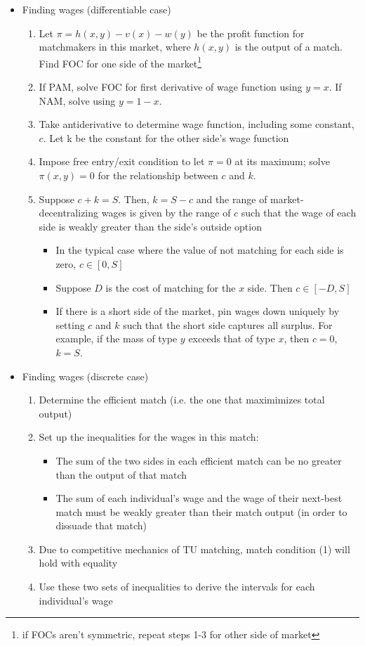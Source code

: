 \documentclass{article}
\begin{document}
\begin{itemize}
	\item Finding wages (differentiable case)
		\begin{enumerate}
			\item Let $\pi=h(x,y)-v(x)-w(y)$ be the profit function for matchmakers in this market, where $h(x,y)$ is the output of a match. Find FOC for one side of the market\footnote{if FOCs aren’t symmetric, repeat steps 1-3 for other side of market}
			\item If PAM, solve FOC for first derivative of wage function using $y=x$. If NAM, solve using $y=1-x$.
			\item Take antiderivative to determine wage function, including some constant, $c$. Let k be the constant for the other side’s wage function
			\item Impose free entry/exit condition to let $\pi=0$ at its maximum; solve $\pi(x,y)=0$ for the relationship between $c$ and $k$. 
			\item Suppose $c+k=S$. Then, $k=S-c$ and the range of market-decentralizing wages is given by the range of $c$ such that the wage of each side is weakly greater than the side’s outside option
				\begin{itemize}
					\item In the typical case where the value of not matching for each side is zero, $c\in[0,S]$
					\item Suppose $D$ is the cost of matching for the $x$ side. Then $c\in[-D,S]$
					\item If there is a short side of the market, pin wages down uniquely by setting $c$ and $k$ such that the short side captures all surplus. For example, if the mass of type $y$ exceeds that of type $x$, then $c=0$, $k=S$.
				\end{itemize}
		\end{enumerate}
		
	\item Finding wages (discrete case)
		\begin{enumerate}
			\item Determine the efficient match (i.e. the one that maximimizes total output)
			\item Set up the inequalities for the wages in this match: 
				\begin{itemize}
					\item The sum of the two sides in each efficient match can be no greater than the output of that match 
					\item The sum of each individual's wage and the wage of their next-best match must be weakly greater than their match output (in order to dissuade that match)
				\end{itemize}
			\item Due to competitive mechanics of TU matching, match condition (1) will hold with equality
			\item Use these two sets of inequalities to derive the intervals for each individual's wage
		\end{enumerate}
\end{itemize}
\end{document}
